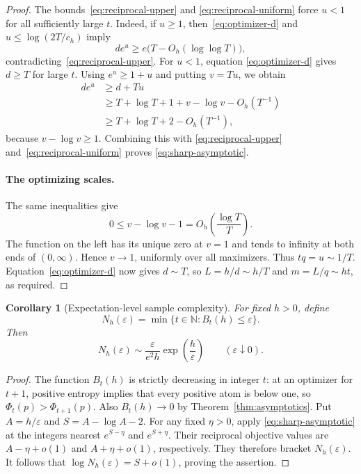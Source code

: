 \documentclass[11pt]{article}
\numberwithin{equation}{section}
\newtheorem{corollary}[theorem]{Corollary}
\begin{document}
\begin{proof}
The bounds~\eqref{eq:reciprocal-upper} and
\eqref{eq:reciprocal-uniform} force $u<1$ for all sufficiently large $t$.
Indeed, if $u\ge1$, then~\eqref{eq:optimizer-d} and
$u\le\log(2T/c_h)$ imply
\[
 de^u\ge e\bigl(T-O_h(\log\log T)\bigr),
\]
contradicting~\eqref{eq:reciprocal-upper}. For $u<1$, equation
\eqref{eq:optimizer-d} gives $d\ge T$ for large $t$. Using
$e^u\ge1+u$ and putting $v=Tu$, we obtain
\begin{equation}\label{eq:scalar-gap}
 \begin{aligned}
 de^u&\ge d+Tu\\
 &\ge T+\log T+1+v-\log v-O_h(T^{-1})\\
 &\ge T+\log T+2-O_h(T^{-1}),
 \end{aligned}
\end{equation}
because $v-\log v\ge1$. Combining this with
\eqref{eq:reciprocal-upper} and~\eqref{eq:reciprocal-uniform} proves
\eqref{eq:sharp-asymptotic}.

\paragraph{The optimizing scales.}
The same inequalities give
\[
 0\le v-\log v-1
 =O_h\!\left(\frac{\log T}{T}\right).
\]
The function on the left has its unique zero at $v=1$ and tends to infinity
at both ends of $(0,\infty)$. Hence $v\to1$, uniformly over all maximizers.
Thus $tq=u\sim1/T$. Equation~\eqref{eq:optimizer-d} now gives $d\sim T$,
so $L=h/d\sim h/T$ and $m=L/q\sim ht$, as required.
\end{proof}

\begin{corollary}[Expectation-level sample complexity]\label{cor:sample-complexity}
For fixed $h>0$, define
\[
 N_h(\varepsilon)=\min\{t\in\mathbb N:B_t(h)\le\varepsilon\}.
\]
Then
\begin{equation}\label{eq:sample-complexity}
 N_h(\varepsilon)\sim
 \frac{\varepsilon}{e^2h}\exp\!\left(\frac h\varepsilon\right)
 \qquad(\varepsilon\downarrow0).
\end{equation}
\end{corollary}
\begin{proof}
The function $B_t(h)$ is strictly decreasing in integer $t$: at an optimizer
for $t+1$, positive entropy implies that every positive atom is below one,
so $\Phi_t(p)>\Phi_{t+1}(p)$. Also $B_t(h)\to0$ by
Theorem~\ref{thm:asymptotics}. Put $A=h/\varepsilon$ and
$S=A-\log A-2$. For any fixed $\eta>0$, apply
\eqref{eq:sharp-asymptotic} at the integers nearest $e^{S-\eta}$ and
$e^{S+\eta}$. Their reciprocal objective values are
$A-\eta+o(1)$ and $A+\eta+o(1)$, respectively. They therefore bracket
$N_h(\varepsilon)$. It follows that
$\log N_h(\varepsilon)=S+o(1)$, proving the assertion.
\end{proof}
\end{document}
